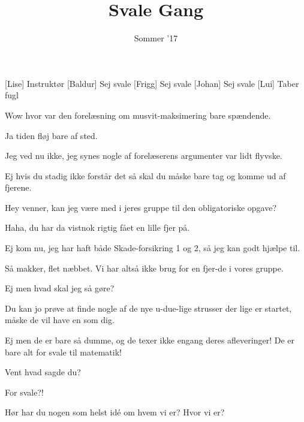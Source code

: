 \documentclass[a4paper,11pt]{article}
\title{Svale Gang}
\author{Sommer '17}
\begin{document}
\maketitle

\begin{roles}
[Lise] Instruktør
[Baldur] Sej svale
[Frigg] Sej svale
[Johan] Sej svale
[Lui] Taber fugl
\end{roles}



\begin{sketch}


 Wow hvor var den forelæsning om musvit-maksimering bare spændende.

 Ja tiden fløj bare af sted.

 Jeg ved nu ikke, jeg synes nogle af forelæserens argumenter var lidt flyvske.

 Ej hvis du stadig ikke forstår det så skal du måske bare tag og komme ud af fjerene.


 Hey venner, kan jeg være med i jeres gruppe til den obligatoriske opgave?

 Haha, du har da vistnok rigtig fået en lille fjer på.

 Ej kom nu, jeg har haft både Skade-forsikring 1 og 2, så jeg kan godt hjælpe til.

 Så makker, flet næbbet. Vi har altså ikke brug for en fjer-de i vores gruppe.

 Ej men hvad skal jeg så gøre?

 Du kan jo prøve at finde nogle af de nye u-due-lige strusser der lige er startet, måske de vil have en som dig.

 Ej men de er bare så dumme, og de texer ikke engang deres afleveringer! De er bare alt for svale til matematik!

 Vent hvad sagde du?

 For svale?!

 Hør har du nogen som helst idé om hvem vi er? Hvor vi er?


\end{sketch}
\end{document}
